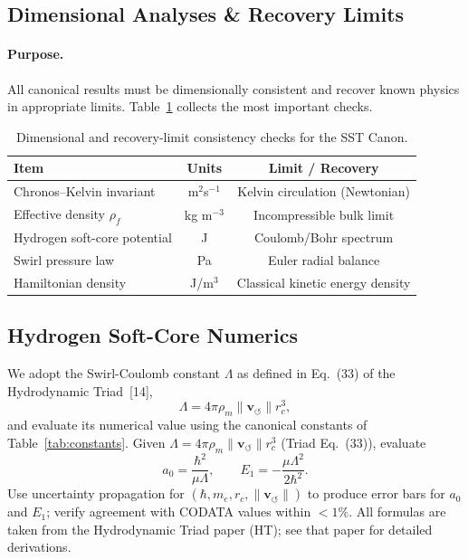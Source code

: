 \subsection{Dimensional Analyses \& Recovery Limits}
\label{canon58:appB}
\paragraph{Purpose.}
    All canonical results must be dimensionally consistent and recover
    known physics in appropriate limits. Table~\ref{canon58:dim-checks}
    collects the most important checks.
    \begin{table}[h!]
        \centering
        \begin{tabular}{|l|c|c|}
            \hline
            \textbf{Item} & \textbf{Units} & \textbf{Limit / Recovery} \\
            \hline
            Chronos--Kelvin invariant & m$^{2}$s$^{-1}$ & Kelvin circulation (Newtonian) \\
            Effective density $\rho_{\!f}$ & kg m$^{-3}$ & Incompressible bulk limit \\
            Hydrogen soft-core potential & J & Coulomb/Bohr spectrum \\
            Swirl pressure law & Pa & Euler radial balance \\
            Hamiltonian density & J/m$^{3}$ & Classical kinetic energy density \\
            \hline
        \end{tabular}
        \caption{Dimensional and recovery-limit consistency checks for the SST Canon.}
        \label{canon58:dim-checks}
    \end{table}


\subsection{Hydrogen Soft-Core Numerics}
\label{canon58:appD}
We adopt the Swirl-Coulomb constant $\Lambda$ as defined in Eq.~(33) of the Hydrodynamic Triad~[14],
\[
    \Lambda = 4\pi \rho_{\!m} \lVert \mathbf{v}_{\!\boldsymbol{\circlearrowleft}}\rVert r_c^{3},
\]
and evaluate its numerical value using the canonical constants of Table~\ref{tab:constants}.
Given $\Lambda = 4\pi \rho_{\!m} \lVert \mathbf{v}_{\!\boldsymbol{\circlearrowleft}}\rVert r_c^{3}$ (Triad Eq.~(33)),
evaluate
\[
    a_0 = \frac{\hbar^{2}}{\mu \Lambda}, \qquad
    E_1 = - \frac{\mu \Lambda^{2}}{2\hbar^{2}}.
\]
Use uncertainty propagation for $(\hbar, m_e, r_c, \lVert \mathbf{v}_{\!\boldsymbol{\circlearrowleft}}\rVert)$ to
produce error bars for $a_0$ and $E_1$; verify agreement with CODATA values
within $<1\%$. All formulas are taken from the Hydrodynamic Triad paper (HT); see that paper for detailed derivations.

